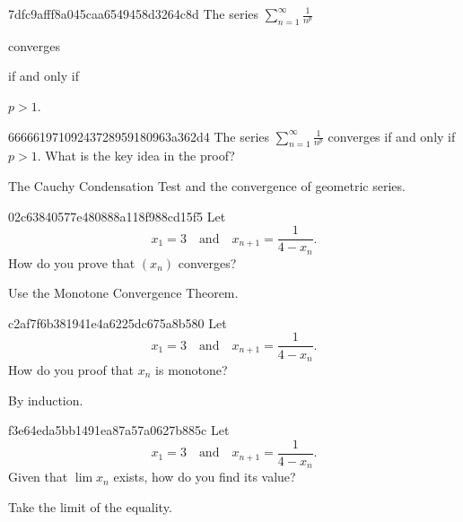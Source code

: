 \begin{note}{7dfc9afff8a045caa6549458d3264c8d}
    The series \({ \sum_{n=1}^{\infty} \frac{1}{n^{p}} }\) \begin{icloze}{2}converges\end{icloze} \begin{icloze}{3}if and only if\end{icloze} \begin{icloze}{1}\({ p > 1 }\).\end{icloze}
\end{note}

\begin{note}{66666197109243728959180963a362d4}
    The series \({ \sum_{n=1}^{\infty} \frac{1}{n^{p}} }\) converges if and only if \({ p > 1 }\).
    What is the key idea in the proof?

    \begin{cloze}{1}
        The Cauchy Condensation Test and the convergence of geometric series.
    \end{cloze}
\end{note}

\begin{note}{02c63840577e480888a118f988cd15f5}
    Let
    \[
        x_1 = 3  \quad \text{and} \quad  x_{n+1} = \frac{1}{4 - x_n}.
    \]
    How do you prove that \({ (x_n) }\) converges?

    \begin{cloze}{1}
        Use the Monotone Convergence Theorem.
    \end{cloze}
\end{note}

\begin{note}{c2af7f6b381941e4a6225dc675a8b580}
    Let
    \[
        x_1 = 3  \quad \text{and} \quad  x_{n+1} = \frac{1}{4 - x_n}.
    \]
    How do you proof that \({ x_n }\) is monotone?

    \begin{cloze}{1}
        By induction.
    \end{cloze}
\end{note}

\begin{note}{f3e64eda5bb1491ea87a57a0627b885c}
    Let
    \[
        x_1 = 3  \quad \text{and} \quad  x_{n+1} = \frac{1}{4 - x_n}.
    \]
    Given that \({ \lim x_n }\) exists, how do you find its value?

    \begin{cloze}{1}
        Take the limit of the equality.
    \end{cloze}
\end{note}

